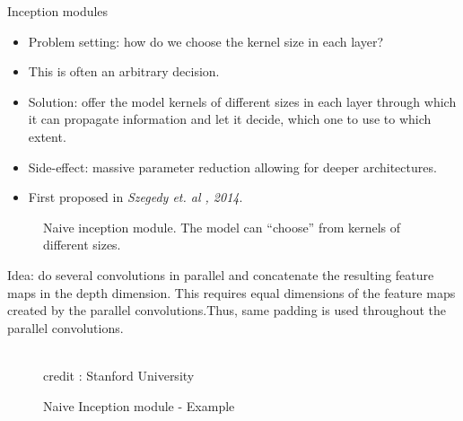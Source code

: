 \begin{vbframe}{Inception modules}
    \begin{itemize}
        \item Problem setting: how do we choose the kernel size in each layer? 
        \item This is often an arbitrary decision.
        \item Solution: offer the model kernels of different sizes in each layer through which it can propagate information and let it decide, which one to use to which extent.
        \item Side-effect: massive parameter reduction allowing for deeper architectures.
        \item First proposed in \textit{Szegedy et. al , 2014}.
    \end{itemize}
\framebreak
  \begin{figure}
    \centering
    \caption{Naive inception module. The model can \enquote{choose} from kernels of different sizes.}
  \end{figure}
        \small{Idea: do several convolutions in parallel and concatenate the resulting feature maps in the depth dimension. This requires equal dimensions of the feature maps created by the parallel convolutions.Thus, same padding is used throughout the parallel convolutions.}
\framebreak 

    \begin{figure}
      \centering
      \tiny{\\ credit : Stanford University}
      \caption{\footnotesize{Naive Inception module - Example}}
      

\end{figure}
\end{vbframe}
